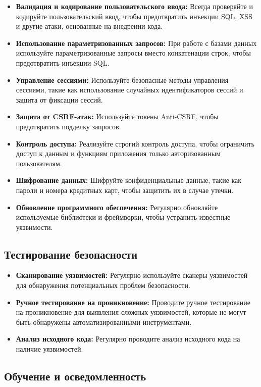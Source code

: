 \documentclass[a4paper,12pt]{diplom}
\begin{document}
	 \begin{itemize}
	 	\item \textbf{Валидация и кодирование пользовательского ввода:} Всегда проверяйте и кодируйте пользовательский ввод, чтобы предотвратить инъекции SQL, XSS и другие атаки, основанные на внедрении кода.
	 	\item \textbf{Использование параметризованных запросов:} При работе с базами данных используйте параметризованные запросы вместо конкатенации строк, чтобы предотвратить инъекции SQL.
	 	\item \textbf{Управление сессиями:} Используйте безопасные методы управления сессиями, такие как использование случайных идентификаторов сессий и защита от фиксации сессий.
	 	\item \textbf{Защита от CSRF-атак:} Используйте токены Anti-CSRF, чтобы предотвратить подделку запросов.
	 	\item \textbf{Контроль доступа:} Реализуйте строгий контроль доступа, чтобы ограничить доступ к данным и функциям приложения только авторизованным пользователям.
	 	\item \textbf{Шифрование данных:} Шифруйте конфиденциальные данные, такие как пароли и номера кредитных карт, чтобы защитить их в случае утечки.
	 	\item \textbf{Обновление программного обеспечения:} Регулярно обновляйте используемые библиотеки и фреймворки, чтобы устранить известные уязвимости.
	 \end{itemize}
	 
	 \subsection{Тестирование безопасности}
	 
	 \begin{itemize}
	 	\item \textbf{Сканирование уязвимостей:} Регулярно используйте сканеры уязвимостей для обнаружения потенциальных проблем безопасности.
	 	\item \textbf{Ручное тестирование на проникновение:} Проводите ручное тестирование на проникновение для выявления сложных уязвимостей, которые не могут быть обнаружены автоматизированными инструментами.
	 	\item \textbf{Анализ исходного кода:} Регулярно проводите анализ исходного кода на наличие уязвимостей.
	 \end{itemize}
	 
	 \subsection{Обучение и осведомленность}
	 
\end{document}
